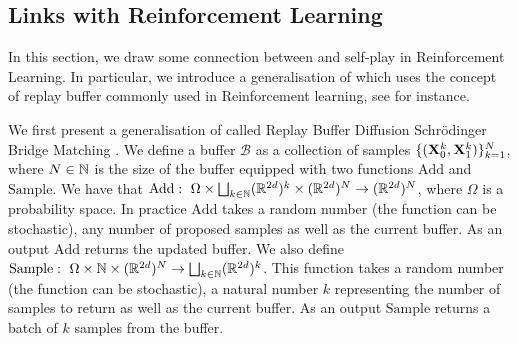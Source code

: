\documentclass{article}
\begin{document}
\subsection{Links with Reinforcement Learning}
\label{sec:links_rl}

In this section, we draw some connection between   and self-play in Reinforcement Learning. In particular, we introduce a generalisation of  which uses the concept of replay buffer commonly used in Reinforcement learning, see \cite{mnih2015human} for instance. 


We first present a generalisation of  called Replay Buffer Diffusion Schr\"odinger Bridge Matching . We define a buffer $\mathcal{B}$ as a collection of samples $\{ (\mathbf{X}_0^k, \mathbf{X}_1^k) \}_{k=1}^N$, where $N \in \mathbb{N}$ is the size of the buffer equipped with two functions $\mathrm{Add}$ and $\mathrm{Sample}$. We have that $\mathrm{Add}: \ \Omega \times \bigsqcup_{k \in \mathbb{N}} (\mathbb{R}^{2d})^k \times (\mathbb{R}^{2d})^N \to (\mathbb{R}^{2d})^N$, where $\Omega$ is a probability space. In practice $\mathrm{Add}$ takes a random number (the function can be stochastic), any number of proposed samples as well as the current buffer. As an output $\mathrm{Add}$ returns the updated buffer. We also define $\mathrm{Sample}: \ \Omega \times \mathbb{N} \times (\mathbb{R}^{2d})^N \to \bigsqcup_{k \in \mathbb{N}} (\mathbb{R}^{2d})^k$. This function takes a random number (the function can be stochastic), a natural number $k$ representing the number of samples to return as well as the current buffer. As an output $\mathrm{Sample}$ returns a batch of $k$ samples from the buffer.
\end{document}

